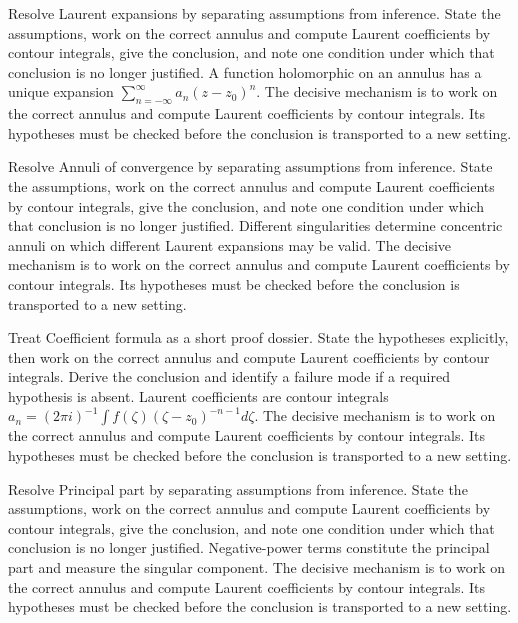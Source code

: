 \begin{example}\label{ex:iv08-worked-01}
Resolve Laurent expansions by separating assumptions from inference. State the assumptions, work on the correct annulus and compute Laurent coefficients by contour integrals, give the conclusion, and note one condition under which that conclusion is no longer justified. A function holomorphic on an annulus has a unique expansion $\sum_{n=-\infty}^{\infty}a_n(z-z_0)^n$. The decisive mechanism is to work on the correct annulus and compute Laurent coefficients by contour integrals. Its hypotheses must be checked before the conclusion is transported to a new setting.
\end{example}

\begin{example}\label{ex:iv08-worked-02}
Resolve Annuli of convergence by separating assumptions from inference. State the assumptions, work on the correct annulus and compute Laurent coefficients by contour integrals, give the conclusion, and note one condition under which that conclusion is no longer justified. Different singularities determine concentric annuli on which different Laurent expansions may be valid. The decisive mechanism is to work on the correct annulus and compute Laurent coefficients by contour integrals. Its hypotheses must be checked before the conclusion is transported to a new setting.
\end{example}

\begin{example}\label{ex:iv08-worked-03}
Treat Coefficient formula as a short proof dossier. State the hypotheses explicitly, then work on the correct annulus and compute Laurent coefficients by contour integrals. Derive the conclusion and identify a failure mode if a required hypothesis is absent. Laurent coefficients are contour integrals $a_n=(2\pi i)^{-1}\int f(\zeta)(\zeta-z_0)^{-n-1}d\zeta$. The decisive mechanism is to work on the correct annulus and compute Laurent coefficients by contour integrals. Its hypotheses must be checked before the conclusion is transported to a new setting.
\end{example}

\begin{example}\label{ex:iv08-worked-04}
Resolve Principal part by separating assumptions from inference. State the assumptions, work on the correct annulus and compute Laurent coefficients by contour integrals, give the conclusion, and note one condition under which that conclusion is no longer justified. Negative-power terms constitute the principal part and measure the singular component. The decisive mechanism is to work on the correct annulus and compute Laurent coefficients by contour integrals. Its hypotheses must be checked before the conclusion is transported to a new setting.
\end{example}

